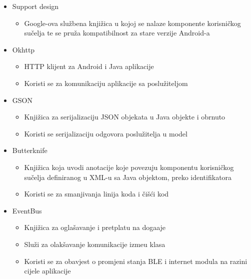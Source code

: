 \begin{itemize}
	\item Support design
	\begin{itemize}
		\item Google-ova slu\v{z}bena knji\v{z}ica u kojoj se nalaze komponente korisni\v{c}kog su\v{c}elja te se pru\v{z}a kompatibilnost za stare verzije Android-a
	\end{itemize}

	\item Okhttp \cite{okhttp}
	\begin{itemize}
		\item HTTP klijent za Android i Java aplikacije
		\item Koristi se za komunikaciju aplikacije sa poslu\v{z}iteljom
	\end{itemize}

	\item GSON \cite{gson}
	\begin{itemize}
		\item Knji\v{z}ica za serijalizaciju JSON objekata u Java objekte i obrnuto
		\item Koristi se serijalizaciju odgovora poslu\v{z}itelja u model
	\end{itemize}
	
	\item Butterknife \cite{butterKnife}
	\begin{itemize}
		\item Knji\v{z}ica koja uvodi anotacije koje povezuju komponentu korisni\v{c}kog su\v{c}elja definiranog u XML-u sa Java objektom, preko identifikatora
		\item Koristi se za smanjivanja linija koda i \v{c}i\v{s}\'{c}i kod
	\end{itemize}


	\item EventBus \cite{eventBus}
	\begin{itemize}
		\item Knji\v{z}ica za ogla\v{s}avanje i pretplatu na doga\dj aje
		\item Slu\v{z}i za olak\v{s}avanje komunikacije izme\dj u klasa
		\item Koristi se za obavjest o promjeni stanja BLE i internet modula na razini cijele aplikacije
	\end{itemize}
\end{itemize}



